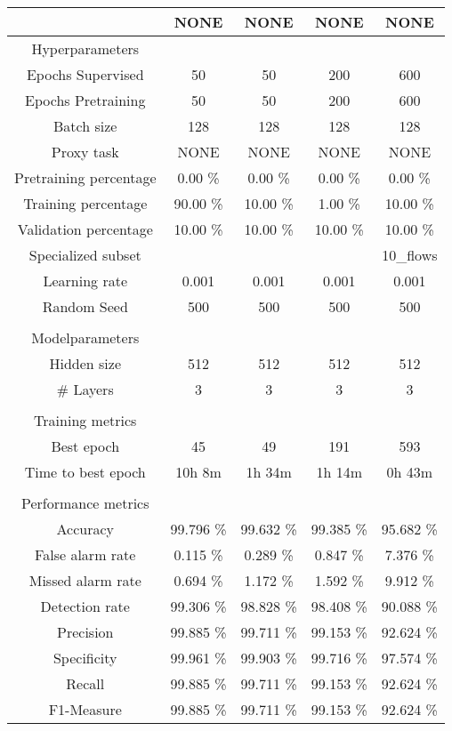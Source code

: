 \begin{table}[htb]
    \centering
    \begin{tabular}{@{}ccccc@{}}
        \toprule
         &  NONE &  NONE &  NONE &  NONE \\
        \midrule
        Hyperparameters &  &  &  &  \\
        Epochs Supervised &  50 &  50 &  200 &  600 \\
        Epochs Pretraining &  50 &  50 &  200 &  600 \\
        Batch size &  128 &  128 &  128 &  128 \\
        Proxy task &  NONE &  NONE &  NONE &  NONE \\
        Pretraining percentage &  0.00 \% &  0.00 \% &  0.00 \% &  0.00 \% \\
        Training percentage &  90.00 \% &  10.00 \% &  1.00 \% &  10.00 \% \\
        Validation percentage &  10.00 \% &  10.00 \% &  10.00 \% &  10.00 \% \\
        Specialized subset &   &   &   &  10\_flows \\
        Learning rate &  0.001 &  0.001 &  0.001 &  0.001 \\
        Random Seed &  500 &  500 &  500 &  500 \\
         \\
        Modelparameters &  &  &  &  \\
        Hidden size &  512 &  512 &  512 &  512 \\
        \# Layers &  3 &  3 &  3 &  3 \\
         \\
        Training metrics &  &  &  &  \\
        Best epoch &  45 &  49 &  191 &  593 \\
        Time to best epoch &  10h 8m &  1h 34m &  1h 14m &  0h 43m \\
         \\
        Performance metrics &  &  &  &  \\
        Accuracy &  99.796 \% &  99.632 \% &  99.385 \% &  95.682 \% \\
        False alarm rate &  0.115 \% &  0.289 \% &  0.847 \% &  7.376 \% \\
        Missed alarm rate &  0.694 \% &  1.172 \% &  1.592 \% &  9.912 \% \\
        Detection rate &  99.306 \% &  98.828 \% &  98.408 \% &  90.088 \% \\
        Precision &  99.885 \% &  99.711 \% &  99.153 \% &  92.624 \% \\
        Specificity &  99.961 \% &  99.903 \% &  99.716 \% &  97.574 \% \\
        Recall &  99.885 \% &  99.711 \% &  99.153 \% &  92.624 \% \\
        F1-Measure &  99.885 \% &  99.711 \% &  99.153 \% &  92.624 \% \\
        \bottomrule
    \end{tabular}
\end{table}